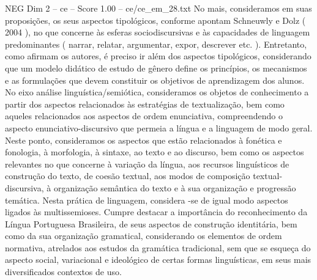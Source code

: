 \begin{textsample}{NEG Dim 2 – ce – Score 1.00 – ce/ce\_em\_28.txt}
No mais, consideramos em suas proposições, os seus aspectos tipológicos, conforme apontam Schneuwly e Dolz ( 2004 ), no que concerne às esferas sociodiscursivas e às capacidades de linguagem predominantes ( narrar, relatar, argumentar, expor, descrever etc. ).
Entretanto, como afirmam os autores, é preciso ir além dos aspectos tipológicos, considerando que um modelo didático de estudo de gênero define os princípios, os mecanismos e as formulações que devem constituir os objetivos de aprendizagem dos alunos.
No eixo análise linguística/semiótica, consideramos os objetos de conhecimento a partir dos aspectos relacionados às estratégias de textualização, bem como aqueles relacionados aos aspectos de ordem enunciativa, compreendendo o aspecto enunciativo-discursivo que permeia a língua e a linguagem de modo geral.
Neste ponto, consideramos os aspectos que estão relacionados à fonética e fonologia, à morfologia, à sintaxe, ao texto e ao discurso, bem como os aspectos relevantes no que concerne à variação da língua, aos recursos linguísticos de construção do texto, de coesão textual, aos modos de composição textual-discursiva, à organização semântica do texto e à sua organização e progressão temática.
Nesta prática de linguagem, considera -se de igual modo aspectos ligados às multissemioses.
Cumpre destacar a importância do reconhecimento da Língua Portuguesa Brasileira, de seus aspectos de construção identitária, bem como da sua organização gramatical, considerando os elementos de ordem normativa, atrelados aos estudos da gramática tradicional, sem que se esqueça do aspecto social, variacional e ideológico de certas formas linguísticas, em seus mais diversificados contextos de uso.

\end{textsample}
